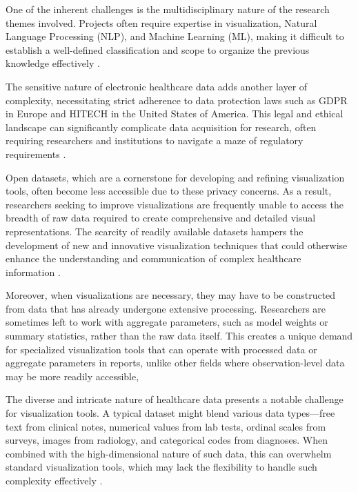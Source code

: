 One of the inherent challenges is the multidisciplinary nature of the research themes involved. Projects often require expertise in visualization, Natural Language Processing (NLP), and Machine Learning (ML), making it difficult to establish a well-defined classification and scope to organize the previous knowledge effectively \cite{soa9}.

The sensitive nature of electronic healthcare data adds another layer of complexity, necessitating strict adherence to data protection laws such as GDPR \cite{soa11} in Europe and HITECH \cite{soa10} in the United States of America. This legal and ethical landscape can significantly complicate data acquisition for research, often requiring researchers and institutions to navigate a maze of regulatory requirements \cite{soa9}.

Open datasets, which are a cornerstone for developing and refining visualization tools, often become less accessible due to these privacy concerns. As a result, researchers seeking to improve visualizations are frequently unable to access the breadth of raw data required to create comprehensive and detailed visual representations. The scarcity of readily available datasets hampers the development of new and innovative visualization techniques that could otherwise enhance the understanding and communication of complex healthcare information \cite{soa9}.

Moreover, when visualizations are necessary, they may have to be constructed from data that has already undergone extensive processing. Researchers are sometimes left to work with aggregate parameters, such as model weights or summary statistics, rather than the raw data itself. This creates a unique demand for specialized visualization tools that can operate with processed data or aggregate parameters in reports, unlike other fields where observation-level data may be more readily accessible,

The diverse and intricate nature of healthcare data presents a notable challenge for visualization tools. A typical dataset might blend various data types—free text from clinical notes, numerical values from lab tests, ordinal scales from surveys, images from radiology, and categorical codes from diagnoses. When combined with the high-dimensional nature of such data, this can overwhelm standard visualization tools, which may lack the flexibility to handle such complexity effectively \cite{soa12}\cite{soa13}.

